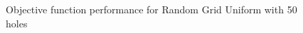 \begin{figure}[H]
\begin{minipage}{.5\linewidth}
\end{minipage}%
\begin{minipage}{.5\linewidth}
\centering
{}
\end{minipage}\par\medskip

\caption{Objective function performance for Random Grid Uniform with 50 holes}
\label{fig:obj-fixed}
\end{figure}



